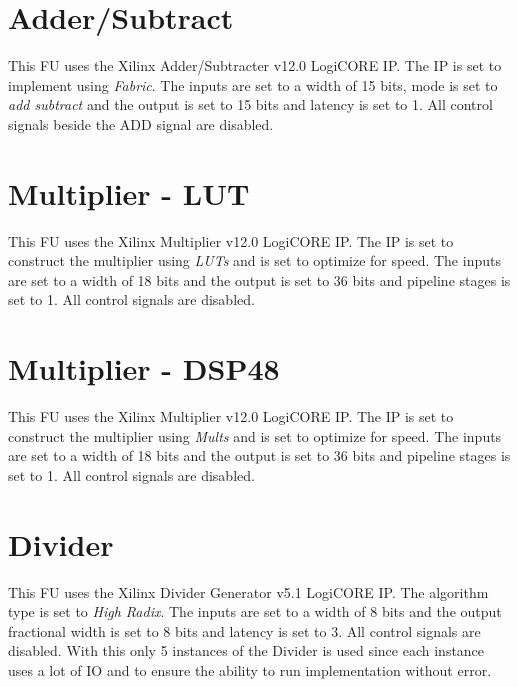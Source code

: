 \section{Adder/Subtract}
This FU uses the Xilinx Adder/Subtracter v12.0 LogiCORE IP. The IP is set to implement using \textit{Fabric}. The inputs are set to a width of 15 bits, mode is set to \textit{add subtract} and the output is set to 15 bits and latency is set to 1. All control signals beside the ADD signal are disabled.

\section{Multiplier - LUT}
This FU uses the Xilinx Multiplier v12.0 LogiCORE IP. The IP is set to construct the multiplier using \textit{LUTs} and is set to optimize for speed. The inputs are set to a width of 18 bits and the output is set to 36 bits and pipeline stages is set to 1. All control signals are disabled.

\section{Multiplier - DSP48}
This FU uses the Xilinx Multiplier v12.0 LogiCORE IP. The IP is set to construct the multiplier using \textit{Mults} and is set to optimize for speed. The inputs are set to a width of 18 bits and the output is set to 36 bits and pipeline stages is set to 1. All control signals are disabled.

\section{Divider}
This FU uses the Xilinx Divider Generator v5.1 LogiCORE IP. The algorithm type is set to \textit{High Radix}. The inputs are set to a width of 8 bits and the output fractional width is set to 8 bits and latency is set to 3. All control signals are disabled. With this only 5 instances of the Divider is used since each instance uses a lot of IO and to ensure the ability to run implementation without error.